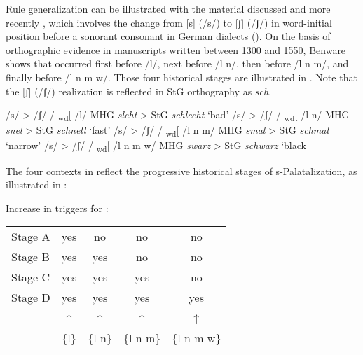 \begin{xlist}
\begin{xlist}
Rule generalization can be illustrated with the material discussed \citet{Benware1996} and more recently \citet{Ramsammy2015}, which involves the change from [s] (/s/) to [ʃ] (/ʃ/) in word-initial position before a sonorant consonant in German dialects (). On the basis of orthographic evidence in manuscripts written between 1300 and 1550, Benware shows that  occurred first before /l/, next before /l n/, then before /l n m/, and finally before /l n m w/. Those four historical stages are illustrated in . Note that the [ʃ] (/ʃ/) realization is reflected in StG orthography as \textit{sch}.

\ea\label{ex:2:27}
\ea\label{ex:2:27a}/s/ > /ʃ/ /    \textsubscript{wd}[  {\longrule}{\longrule} /l/       \tab MHG \textit{sleht} > StG \textit{schlecht}  ‘bad’
\ex\label{ex:2:27b}/s/ > /ʃ/ /   \textsubscript{wd}[  {\longrule}{\longrule} /l n/     \tab MHG \textit{snel} > StG \textit{schnell}  ‘fast’
\ex\label{ex:2:27c}/s/ > /ʃ/ /   \textsubscript{wd}[  {\longrule}{\longrule} /l n m/   \tab MHG \textit{smal} > StG \textit{schmal}  ‘narrow’
\ex\label{ex:2:27d}/s/ > /ʃ/ /   \textsubscript{wd}[  {\longrule}{\longrule} /l n m w/ \tab MHG \textit{swarz} > StG \textit{schwarz}  ‘black
\z
\z 

The four contexts in  reflect the progressive historical stages of s-Pal\-a\-tal\-i\-za\-tion, as illustrated in :

\ea%
\label{ex:2:28}Increase in triggers for :\\
\begin{tabular}{@{}lcccc@{}}
  Stage A &  yes    &     no   &      no    &     no     \\
  Stage B &  yes    &     yes  &      no    &     no     \\
  Stage C &  yes    &     yes  &     yes    &     no     \\
  Stage D &  yes    &     yes  &     yes    &     yes    \\
          &    ↑    &      ↑   &      ↑     &      ↑     \\
          &  \{l\}  &  \{l n\} &  \{l n m\} & \{l n m w\}\\
\end{tabular}
\z


\end{xlist}
\end{xlist}
